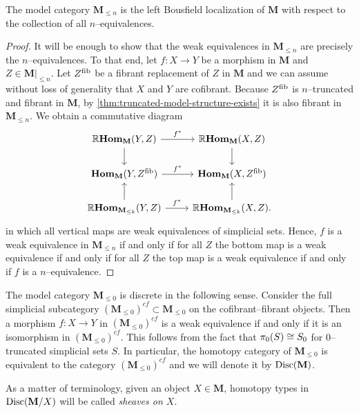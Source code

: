\begin{corollary}\label{cor:weak-equiv-level}
  The model category \(\mathbf M_{\leq n}\) is the left Bousfield
  localization of \(\mathbf M\) with respect to the collection of all
  \(n\)--equivalences.
\end{corollary}
\begin{proof}
  It will be enough to show that the weak equivalences in \(\mathbf
  M_{\leq n}\) are precisely the \(n\)--equivalences. To that end, let
  \(f\colon X\to Y\) be a morphism in \(\mathbf M\) and \(Z\in\mathbf
  M|_{\leq n}\). Let \(Z^{\operatorname{\textnormal{fib}}}\) be a fibrant replacement of \(Z\) in
  \(\mathbf M\) and we can assume without loss of generality that
  \(X\) and \(Y\) are cofibrant. Because \(Z^{\operatorname{\textnormal{fib}}}\) is
  \(n\)--truncated and fibrant in \(\mathbf M\), by
  \autoref{thm:truncated-model-structure-exists} it is also fibrant in
  \(\mathbf M_{\leq n}\). We obtain a commutative diagram
  \[
  \begin{tikzcd}
    \RHom_{\mathbf M}(Y, Z) \arrow[r, "f^{*}"] \arrow[d] & \RHom_{\mathbf M}(X, Z) \arrow[d] \\
    \Hom_{\mathbf M}(Y, Z^{\fib}) \arrow[r, "f^{*}"] & \Hom_{\mathbf M}(X, Z^{\fib}) \\
    \RHom_{\mathbf M_{\leq k}}(Y, Z) \arrow[r, "f^{*}"] \arrow[u] & \RHom_{\mathbf M_{\leq k}}(X, Z). \arrow[u]
  \end{tikzcd}
  \]
  in which all vertical maps are weak equivalences of simplicial
  sets. Hence, \(f\) is a weak equivalence in \(\mathbf M_{\leq n}\)
  if and only if for all \(Z\) the bottom map is a weak equivalence if
  and only if for all \(Z\) the top map is a weak equivalence if and
  only if \(f\) is a \(n\)--equivalence.
\end{proof}

\begin{remark}
  The model category \(\mathbf M_{\leq 0}\) is discrete in the
  following sense. Consider the full simplicial subcategory \((\mathbf
  M_{\leq 0})^{cf}\subset \mathbf M_{\leq 0}\) on the
  cofibrant--fibrant objects. Then a morphism \(f\colon X\to Y\) in
  \((\mathbf M_{\leq 0})^{cf}\) is a weak equivalence if and only if
  it is an isomorphism in \((\mathbf M_{\leq 0})^{cf}\). This follows
  from the fact that \(\pi_{0}(S) \cong S_{0}\) for \(0\)--truncated
  simplicial sets \(S\). In particular, the homotopy category of
  \(\mathbf M_{\leq 0}\) is equivalent to the category \((\mathbf
  M_{\leq 0})^{cf}\) and we will denote it by \(\operatorname{\textnormal{Disc}}(\mathbf M)\).

  As a matter of terminology, given an object \(X\in\mathbf M\),
  homotopy types in \(\operatorname{\textnormal{Disc}}(\mathbf M/X)\) will be called
  \emph{sheaves on \(X\)}.
\end{remark}

